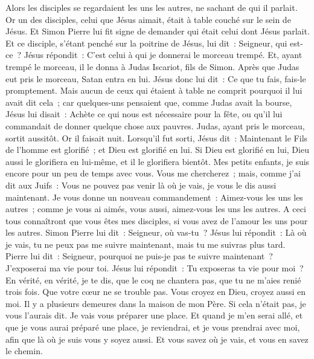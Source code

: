 \begin{multicols}{2}
Alors les disciples se regardaient les uns les autres, ne sachant de qui il parlait.
Or un des disciples, celui que Jésus aimait, était à table couché sur le sein de Jésus.
Et Simon Pierre lui fit signe de demander qui était celui dont Jésus parlait.
Et ce disciple, s'étant penché sur la poitrine de Jésus, lui dit~: Seigneur, qui est-ce~?
Jésus répondit~: C'est celui à qui je donnerai le morceau trempé. Et, ayant trempé le morceau, il le donna à Judas Iscariot, fils de Simon.
Après que Judas eut pris le morceau, Satan entra en lui. Jésus donc lui dit~: Ce que tu fais, fais-le promptement.
Mais aucun de ceux qui étaient à table ne comprit pourquoi il lui avait dit cela~;
car quelques-uns pensaient que, comme Judas avait la bourse, Jésus lui disait~: Achète ce qui nous est nécessaire pour la fête, ou qu'il lui commandait de donner quelque chose aux pauvres.
Judas, ayant pris le morceau, sortit aussitôt. Or il faisait nuit.
Lorsqu'il fut sorti, Jésus dit~: Maintenant le Fils de l'homme est glorifié~; et Dieu est glorifié en lui.
Si Dieu est glorifié en lui, Dieu aussi le glorifiera en lui-même, et il le glorifiera bientôt.
Mes petits enfants, je suis encore pour un peu de temps avec vous. Vous me chercherez~; mais, comme j'ai dit aux Juifs~: Vous ne pouvez pas venir là où je vais, je vous le dis aussi maintenant.
Je vous donne un nouveau commandement~: Aimez-vous les uns les autres~; comme je vous ai aimés, vous aussi, aimez-vous les uns les autres.
A ceci tous connaîtront que vous êtes mes disciples, si vous avez de l'amour les uns pour les autres.
Simon Pierre lui dit~: Seigneur, où vas-tu~? Jésus lui répondit~: Là où je vais, tu ne peux pas me suivre maintenant, mais tu me suivras plus tard.
Pierre lui dit~: Seigneur, pourquoi ne puis-je pas te suivre maintenant~? J'exposerai ma vie pour toi.
Jésus lui répondit~: Tu exposeras ta vie pour moi~? En vérité, en vérité, je te dis, que le coq ne chantera pas, que tu ne m'aies renié trois fois.
\VerseOne{}Que votre cœur ne se trouble pas. Vous croyez en Dieu, croyez aussi en moi.
Il y a plusieurs demeures dans la maison de mon Père. Si cela n'était pas, je vous l'aurais dit. Je vais vous préparer une place.
Et quand je m'en serai allé, et que je vous aurai préparé une place, je reviendrai, et je vous prendrai avec moi, afin que là où je suis vous y soyez aussi.
Et vous savez où je vais, et vous en savez le chemin.

\end{multicols}
